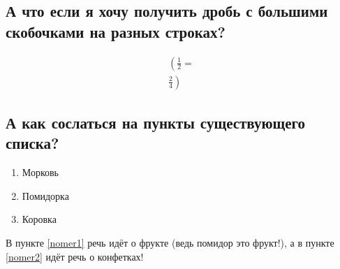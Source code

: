 \documentclass[12pt, a4paper]{article}
\begin{document}
\subsection{А что если я хочу получить дробь с большими скобочками на разных строках?}

\begin{align*}
	\left( \frac{1}{2} = \right. \\
	\left. \frac{2}{4} \right)
\end{align*}

\subsection{А как сослаться на пункты существующего списка?}

\begin{enumerate}
\item Морковь
\item Помидорка\label{nomer1}
\item Коровка\label{nomer2}
\end{enumerate}

В пункте \ref{nomer1} речь идёт о фрукте (ведь помидор это фрукт!), а в пункте \ref{nomer2} идёт речь о конфетках!
\end{document}
